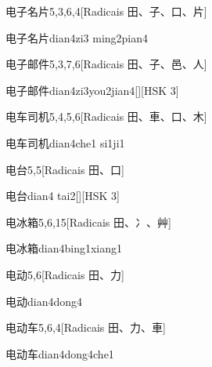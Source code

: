 \begin{entry}{电子名片}{5,3,6,4}[Radicais ⽥、⼦、⼝、⽚]
  \begin{phonetics}{电子名片}{dian4zi3 ming2pian4}
  \end{phonetics}
\end{entry}

\begin{entry}{电子邮件}{5,3,7,6}[Radicais ⽥、⼦、⾢、⼈]
  \begin{phonetics}{电子邮件}{dian4zi3you2jian4}[][HSK 3]
  \end{phonetics}
\end{entry}

\begin{entry}{电车司机}{5,4,5,6}[Radicais ⽥、⾞、⼝、⽊]
  \begin{phonetics}{电车司机}{dian4che1 si1ji1}
  \end{phonetics}
\end{entry}

\begin{entry}{电台}{5,5}[Radicais ⽥、⼝]
  \begin{phonetics}{电台}{dian4 tai2}[][HSK 3]
  \end{phonetics}
\end{entry}

\begin{entry}{电冰箱}{5,6,15}[Radicais ⽥、⼎、⾋]
  \begin{phonetics}{电冰箱}{dian4bing1xiang1}
  \end{phonetics}
\end{entry}

\begin{entry}{电动}{5,6}[Radicais ⽥、⼒]
  \begin{phonetics}{电动}{dian4dong4}
  \end{phonetics}
\end{entry}

\begin{entry}{电动车}{5,6,4}[Radicais ⽥、⼒、⾞]
  \begin{phonetics}{电动车}{dian4dong4che1}
  \end{phonetics}
\end{entry}

